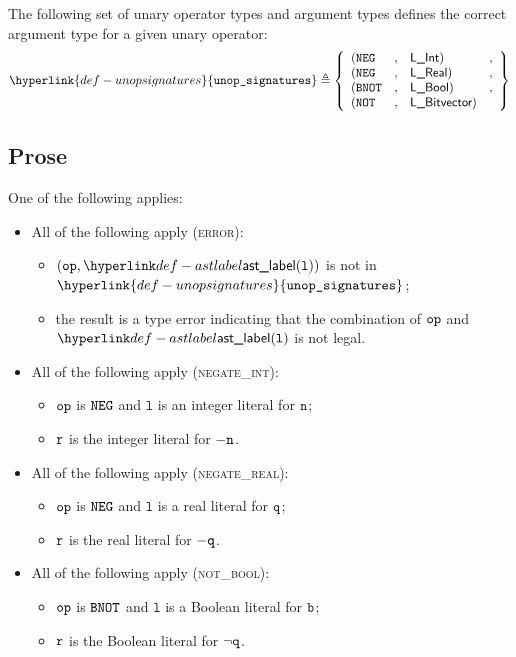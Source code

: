 \documentclass{book}
\newcommand\unopsignatures[0]{\hyperlink{def-unopsignatures}{\texttt{unop\_signatures}}}
\newcommand\vl[0]{\texttt{l}}
\begin{document}
\hypertarget{def-unopsignatures}{}
The following set of unary operator types and argument types defines the correct argument type
for a given unary operator:
\[
\unopsignatures \triangleq
\left\{
\begin{array}{lcll}
  (\NEG   &,& \lint)        &,\\
  (\NEG   &,& \lreal)       &,\\
  (\BNOT  &,& \lbool)       &,\\
  (\NOT   &,& \lbitvector)  &\\
\end{array}
\right\}
\]

\subsection{Prose}
One of the following applies:
\begin{itemize}
  \item All of the following apply (\textsc{error}):
  \begin{itemize}
    \item $(\op, \astlabel(\vl))$ is not in $\unopsignatures$;
    \item the result is a type error indicating that the combination of $\texttt{op}$ and $\astlabel(\vl)$
          is not legal.
  \end{itemize}

  \item All of the following apply (\textsc{negate\_int}):
  \begin{itemize}
    \item $\texttt{op}$ is $\texttt{NEG}$ and $\vl$ is an integer literal for $\texttt{n}$;
    \item $\texttt{r}$ is the integer literal for $- \texttt{n}$.
  \end{itemize}

  \item All of the following apply (\textsc{negate\_real}):
  \begin{itemize}
    \item $\texttt{op}$ is $\texttt{NEG}$ and $\vl$ is a real literal for $\texttt{q}$;
    \item $\texttt{r}$ is the real literal for $- \texttt{q}$.
  \end{itemize}

  \item All of the following apply (\textsc{not\_bool}):
  \begin{itemize}
    \item $\texttt{op}$ is $\texttt{BNOT}$ and $\vl$ is a Boolean literal for $\texttt{b}$;
    \item $\texttt{r}$ is the Boolean literal for $\neg\texttt{q}$.
  \end{itemize}


\end{itemize}
\end{document}
